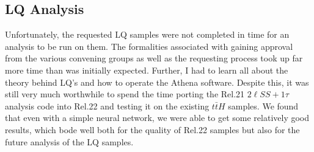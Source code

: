 \subsection{LQ Analysis}
    Unfortunately, the requested LQ samples were not completed in time for an analysis to be run on them. The formalities associated with gaining approval from the various convening groups as well as the requesting process took up far more time than was initially expected. Further, I had to learn all about the theory behind LQ's and how to operate the Athena software. Despite this, it was still very much worthwhile to spend the time porting the Rel.21 $2\ell SS + 1\tau$ analysis code into Rel.22 and testing it on the existing $t\bar{t}H$ samples. We found that even with a simple neural network, we were able to get some relatively good results, which bode well both for the quality of Rel.22 samples but also for the future analysis of the LQ samples.